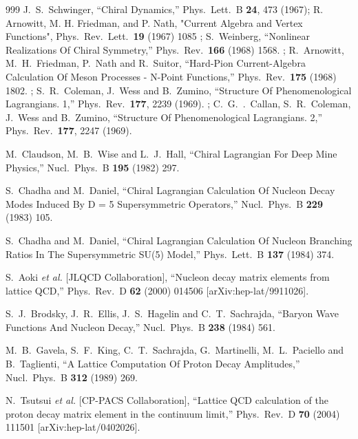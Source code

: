 \begin{thebibliography}{999}
  J.~S.~Schwinger,
  ``Chiral Dynamics,''
  Phys.\ Lett.\ B {\bf 24}, 473 (1967);
R. Arnowitt, M. H. Friedman, and P. Nath,
"Current Algebra and Vertex Functions",
  Phys.\ Rev.\ Lett.\  {\bf 19} (1967) 1085
;
  S.~Weinberg,
  ``Nonlinear Realizations Of Chiral Symmetry,''
  Phys.\ Rev.\  {\bf 166} (1968) 1568.
;
 R.~Arnowitt, M.~H.~Friedman, P.~Nath and R.~Suitor,
  ``Hard-Pion Current-Algebra Calculation Of Meson Processes - N-Point
  Functions,''
  Phys.\ Rev.\  {\bf 175} (1968) 1802.
;
  S.~R.~Coleman, J.~Wess and B.~Zumino,
  ``Structure Of Phenomenological Lagrangians. 1,''
  Phys.\ Rev.\  {\bf 177}, 2239 (1969).
;
  C.~G.~.~Callan, S.~R.~Coleman, J.~Wess and B.~Zumino,
  ``Structure Of Phenomenological Lagrangians. 2,''
  Phys.\ Rev.\  {\bf 177}, 2247 (1969).

  M.~Claudson, M.~B.~Wise and L.~J.~Hall,
  ``Chiral Lagrangian For Deep Mine Physics,''
  Nucl.\ Phys.\ B {\bf 195} (1982) 297.

  S.~Chadha and M.~Daniel,
  ``Chiral Lagrangian Calculation Of Nucleon Decay Modes Induced By D = 5
  Supersymmetric Operators,''
  Nucl.\ Phys.\ B {\bf 229} (1983) 105.

  S.~Chadha and M.~Daniel,
  ``Chiral Lagrangian Calculation Of Nucleon Branching Ratios In The
  Supersymmetric SU(5) Model,''
  Phys.\ Lett.\ B {\bf 137} (1984) 374.

  S.~Aoki {\it et al.}  [JLQCD Collaboration],
  ``Nucleon decay matrix elements from lattice QCD,''
  Phys.\ Rev.\ D {\bf 62} (2000) 014506
  [arXiv:hep-lat/9911026].

  S.~J.~Brodsky, J.~R.~Ellis, J.~S.~Hagelin and C.~T.~Sachrajda,
  ``Baryon Wave Functions And Nucleon Decay,''
  Nucl.\ Phys.\ B {\bf 238} (1984) 561.

  M.~B.~Gavela, S.~F.~King, C.~T.~Sachrajda, G.~Martinelli, M.~L.~Paciello and B.~Taglienti,
  ``A Lattice Computation Of Proton Decay Amplitudes,''
  Nucl.\ Phys.\ B {\bf 312} (1989) 269.

  N.~Tsutsui {\it et al.}  [CP-PACS Collaboration],
   ``Lattice QCD calculation of the proton decay matrix element in the
  continuum limit,''
  Phys.\ Rev.\ D {\bf 70} (2004) 111501
  [arXiv:hep-lat/0402026].



\end{thebibliography}
